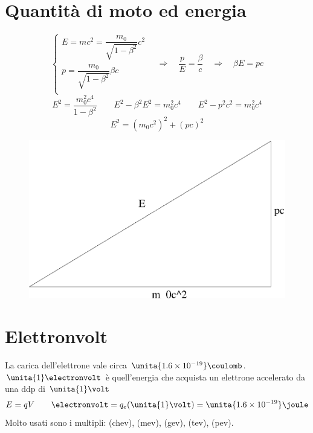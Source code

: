 \section{Quantità di moto ed energia}
$$\left\{
\begin{array}{l}
E=mc^2=\dfrac{m_0}{\sqrt{1-\beta^2}}c^2\\
p=\dfrac{m_0}{\sqrt{1-\beta^2}}\beta c\\
\end{array}\right.
\quad\Rightarrow\quad
\dfrac{p}{E}=\dfrac{\beta}{c}
\quad\Rightarrow\quad\beta E=pc
$$
$$E^2=\frac{m_0^2c^4}{1-\beta^2}\qquad E^2-\beta^2 E^2=m_0^2c^4\qquad E^2-p^2c^2=m_0^2c^4$$
$$E^2=(m_0c^2)^2+(pc)^2$$
\begin{figure}[htbp]
   \centering
   \includegraphics[scale=0.4]{immagini/fisica1/Trg_rel}
\end{figure}

\section{Elettronvolt}
La carica dell'elettrone vale circa $\unita{1.6\times 10^{-19}}\coulomb$. $\unita{1}\electronvolt$ è quell'energia che acquista un elettrone accelerato da una ddp di $\unita{1}\volt$
\begin{equation*}
E=qV\qquad \electronvolt=q_e(\unita{1}\volt)=\unita{1.6\times 10^{-19}}\joule
\end{equation*}
Molto usati sono i multipli: \kilo\electronvolt (chev), \mega\electronvolt (mev), \giga\electronvolt (gev), \tera\electronvolt (tev), \peta\electronvolt (pev).

